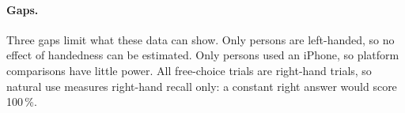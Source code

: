 
\paragraph{Gaps.} Three gaps limit what these data can show. Only  persons are
left-handed, so no effect of handedness can be estimated. Only  persons used an iPhone, so
platform comparisons have little power. All free-choice trials are right-hand trials, so natural use measures
right-hand recall only: a constant right answer would score 100\,\%.
